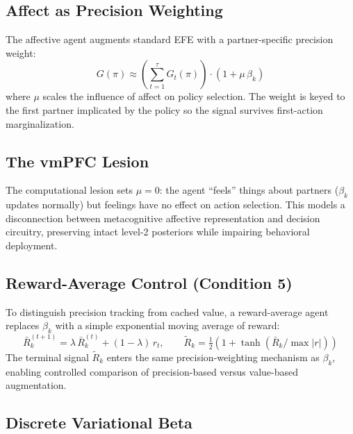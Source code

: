 \documentclass[11pt,a4paper]{article}
\begin{document}
\subsection{Affect as Precision Weighting}

The affective agent augments standard EFE with a partner-specific precision weight:
\begin{equation}
  G(\pi) \approx \left(\sum_{t=1}^{\tau} G_t(\pi)\right) \cdot (1 + \mu\, \beta_k)
\label{eq:precision_weight}
\end{equation}
where $\mu$ scales the influence of affect on policy selection. The weight is keyed to the first partner implicated by the policy so the signal survives first-action marginalization.

\subsection{The vmPFC Lesion}

The computational lesion sets $\mu = 0$: the agent ``feels'' things about partners ($\beta_k$ updates normally) but feelings have no effect on action selection. This models a disconnection between metacognitive affective representation and decision circuitry, preserving intact level-2 posteriors while impairing behavioral deployment.

\subsection{Reward-Average Control (Condition 5)}

To distinguish precision tracking from cached value, a reward-average agent replaces $\beta_k$ with a simple exponential moving average of reward:
\begin{equation}
  \bar{R}_k^{(t+1)} = \lambda\, \bar{R}_k^{(t)} + (1 - \lambda)\, r_t, \qquad
  \tilde{R}_k = \tfrac{1}{2}(1 + \tanh(\bar{R}_k / \max |r|))
\end{equation}
The terminal signal $\tilde{R}_k$ enters the same precision-weighting mechanism as $\beta_k$, enabling controlled comparison of precision-based versus value-based augmentation.

\subsection{Discrete Variational Beta}
\end{document}
